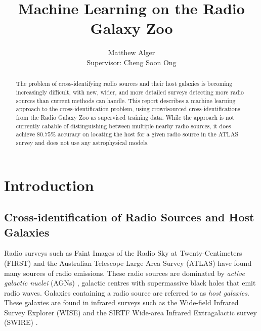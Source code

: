 \documentclass[a4paper]{article}
\begin{document}



  \title{Machine Learning on the Radio Galaxy Zoo}

  \author{Matthew Alger \\ Supervisor: Cheng Soon Ong}

  \maketitle

  \begin{abstract}
    The problem of cross-identifying radio sources and their host galaxies is becoming increasingly difficult, with new, wider, and more detailed surveys detecting more radio sources than current methods can handle. This report describes a machine learning approach to the cross-identification problem, using crowdsourced cross-identifications from the Radio Galaxy Zoo as supervised training data. While the approach is not currently cabable of distinguishing between multiple nearby radio sources, it does achieve $80.75\%$ accuracy on locating the host for a given radio source in the ATLAS survey and does not use any astrophysical models.
  \end{abstract}

  \section{Introduction}

    \subsection{Cross-identification of Radio Sources and Host Galaxies}

      Radio surveys such as Faint Images of the Radio Sky at Twenty-Centimeters (FIRST) \cite{white97,becker95} and the Australian Telescope Large Area Survey (ATLAS) \cite{franzen15} have found many sources of radio emissions. These radio sources are dominated by \emph{active galactic nuclei} (AGNs) \cite{banfield15}, galactic centres with supermassive black holes that emit radio waves\cite{peterson97}. Galaxies containing a radio source are referred to as \emph{host galaxies}. These galaxies are found in infrared surveys such as the Wide-field Infrared Survey Explorer (WISE) \cite{wright10} and the SIRTF Wide-area Infrared Extragalactic survey (SWIRE) \cite{surace05,lonsdale03}.
\end{document}
